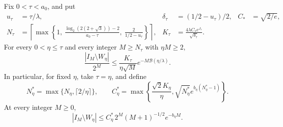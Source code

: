 \begin{proposition}
\label{prop:Shaik-uniform-prefactor}
Fix \(0<\tau<a_0\), and put
\begin{align*}
 u_\tau&=\tau/\lambda,&
 \delta_\tau&=(1/2-u_\tau)/2,&
 C_*&=\sqrt{2/e},\\
 N_\tau&=\left\lceil\max\left\{1,\
 \frac{\log_2(2(2+\sqrt3))-2}{a_0-\tau},\
 \frac{2}{1/2-u_\tau}\right\}\right\rceil,&
 K_\tau&=\frac{4\lambda C_*e^{J_\tau}}{\sqrt{\delta_\tau}} .
\end{align*}
For every \(0<\eta\le\tau\) and every integer
\(M\ge N_\tau\) with \(\eta M\ge2\),
\begin{equation}\label{eq:Shaik-uniform-prefactor}
 \frac{|I_M\setminus W_\eta|}{2^M}
 \le\frac{K_\tau}{\eta\sqrt M}
          e^{-M\mathcal B(\eta/\lambda)} .
\end{equation}
In particular, for fixed \(\eta\), take \(\tau=\eta\), and define
\[
 N_\eta^*=\max\{N_\eta,\lceil2/\eta\rceil\},\qquad
 C_\eta^*=\max\left\{\frac{\sqrt2 K_\eta}{\eta},
       \sqrt{N_\eta^*}e^{b_\eta(N_\eta^*-1)}\right\}.
\]
At every integer \(M\ge0\),
\begin{equation}\label{eq:Shaik-fixed-prefactor}
 |I_M\setminus W_\eta|
 \le C_\eta^*\,2^M(M+1)^{-1/2}e^{-b_\eta M}.
\end{equation}
\end{proposition}
